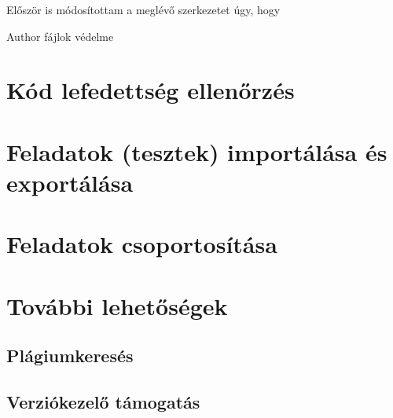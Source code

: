 Először is módosítottam a meglévő szerkezetet úgy, hogy 

Author fájlok védelme

\section{Kód lefedettség ellenőrzés}

\section{Feladatok (tesztek) importálása és exportálása}

\section{Feladatok csoportosítása}

\section{További lehetőségek}

\subsection{Plágiumkeresés}

\subsection{Verziókezelő támogatás}